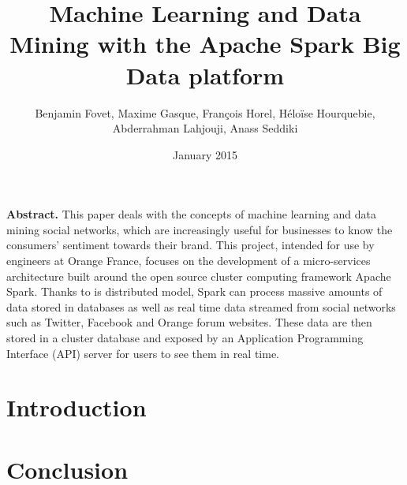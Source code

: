 \documentclass[11pt]{article}
\title{Machine Learning and Data Mining with the Apache Spark Big Data platform}
\author{Benjamin Fovet, Maxime Gasque, François Horel, Héloïse Hourquebie, Abderrahman Lahjouji, Anass Seddiki}
\affil{\texttt{\{bfovet, mgasque, fhorel, hhourquebie, alahjouji, aseddiki\} @enseirb-matmeca.fr}}
\date{January 2015}
\begin{document}
\maketitle

\textbf{Abstract.} This paper deals with the concepts of machine learning and data mining social networks, which are increasingly useful for businesses to know the consumers' sentiment towards their brand. This project, intended for use by engineers at Orange France, focuses on the development of a micro-services architecture built around the open source cluster computing framework Apache Spark. Thanks to is distributed model, Spark can process massive amounts of data stored in databases as well as real time data streamed from social networks such as Twitter, Facebook and Orange forum websites. These data are then stored in a cluster database and exposed by an Application Programming Interface (API) server for users to see them in real time.


\tableofcontents

\section{Introduction}

\section{Conclusion}



\end{document}

